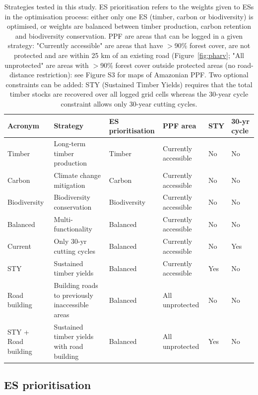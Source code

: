 \documentclass{article}
\begin{document}
\begin{table}
    \centering
    \begin{tabularx}{\textwidth}{p{2cm} p{4.5cm} p{2cm} p{3.5cm} p{0.8cm} p{1cm}}
    \toprule
         Acronym & Strategy & ES prioritisation & PPF area &  STY & 30-yr cycle \\
         \midrule
         Timber & Long-term timber production & Timber  & Currently accessible & No & No\\
         Carbon & Climate change mitigation &  Carbon & Currently accessible & No & No\\
         Biodiversity & Biodiversity conservation &  Biodiversity & Currently accessible & No & No \\
         Balanced & Multi-functionality & Balanced & Currently accessible & No & No \\
         Current & Only 30-yr cutting cycles & Balanced & Currently accessible & No & Yes \\
         STY & Sustained timber yields & Balanced & Currently accessible & Yes & No \\
         Road building & Building roads to previously inaccessible areas & Balanced & All unprotected & No & No \\
         STY + Road building & Sustained timber yields with road building & Balanced & All unprotected & Yes & No \\
         \bottomrule
    \end{tabularx}
    \caption{Strategies tested in this study. ES prioritisation refers to the weights given to ESs in the optimisation process: either only one ES (timber, carbon or biodiversity) is optimised, or weights are balanced between timber production, carbon retention and biodiversity conservation. PPF are areas that can be logged in a given strategy: "Currently accessible" are areas that have $>$90\% forest cover, are not protected and are within 25 km of an existing road (Figure~\ref{fig:pharv}; "All unprotected" are areas with $>$90\% forest cover outside protected areas (no road-distance restriction): see Figure S3 for maps of Amazonian PPF. Two optional constraints can be added: STY (Sustained Timber Yields) requires that the total timber stocks are recovered over all logged grid cells whereas the 30-year cycle constraint allows only 30-year cutting cycles.}
    \label{tab:strategies}
\end{table}

\subsection{ES prioritisation}
\end{document}
